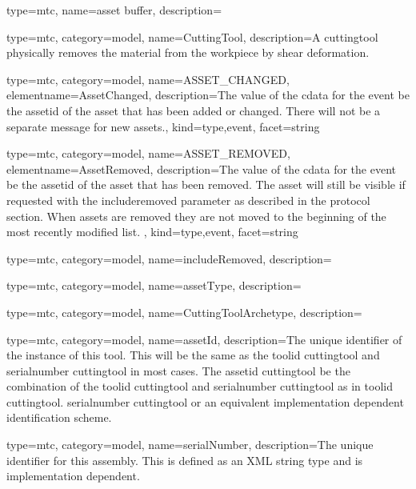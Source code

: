 {
  type=mtc,
  name={asset buffer},
  description={}
}


{
  type=mtc,
  category=model,
  name={CuttingTool},
  description={A \gls{cuttingtool} physically removes the material from the workpiece by shear deformation.}
}


{
  type=mtc,
  category=model,
  name={ASSET\_CHANGED},
  elementname={AssetChanged},
  description={The value of the \gls{cdata} for the event \MUST be the \gls{assetid} of the asset that has been added or changed. There will not be a separate message for new assets.},
  kind={type,event},
  facet={\gls{string}}
}


{
  type=mtc,
  category=model,
  name={ASSET\_REMOVED},
  elementname={AssetRemoved},
  description={The value of the \gls{cdata} for the event \MUST be the \gls{assetid} of the asset that has been removed. The asset will still be visible if requested with the \gls{includeremoved} parameter as described in the protocol section. When assets are removed they are not moved to the beginning of the most recently modified list. },
  kind={type,event},
  facet={\gls{string}}
}


{
  type=mtc,
  category=model,
  name={includeRemoved},
  description={}
}


{
  type=mtc,
  category=model,
  name={assetType},
  description={}
}


{
  type=mtc,
  category=model,
  name={CuttingToolArchetype},
  description={}
}


{
  type=mtc,
  category=model,
  name={assetId},
  description={The unique identifier of the instance of this tool. This will be the same as the \gls{toolid cuttingtool} and \gls{serialnumber cuttingtool} in most cases. The \gls{assetid cuttingtool} \SHOULD be the combination of the \gls{toolid cuttingtool} and \gls{serialnumber cuttingtool} as in \gls{toolid cuttingtool}. \gls{serialnumber cuttingtool} or an equivalent implementation dependent identification scheme.}
}


{
  type=mtc,
  category=model,
  name={serialNumber},
  description={The unique identifier for this assembly. This is defined as an XML string type and is implementation dependent.}
}



